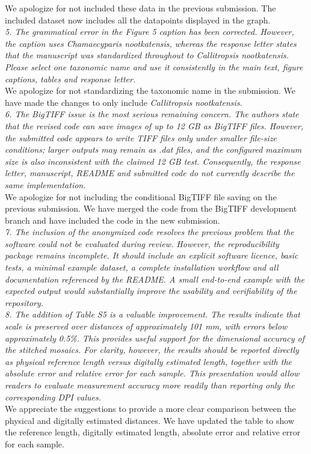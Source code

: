 \documentclass[12pt,a4paper]{article}
\begin{document}
We apologize for not included these data in the previous submission. The included dataset now includes all the datapoints displayed in the graph. \\ 

\emph{5.      The grammatical error in the Figure 5 caption has been corrected. However, the caption uses Chamaecyparis nootkatensis, whereas the response letter states that the manuscript was standardized throughout to Callitropsis nootkatensis. Please select one taxonomic name and use it consistently in the main text, figure captions, tables and response letter.} \\

We apologize for not standardizing the taxonomic name in the submission. We have made the changes to only include \emph{Callitropsis nootkatensis}. \\

\emph{6.      The BigTIFF issue is the most serious remaining concern. The authors state that the revised code can save images of up to 12 GB as BigTIFF files. However, the submitted code appears to write TIFF files only under smaller file-size conditions; larger outputs may remain as .dat files, and the configured maximum size is also inconsistent with the claimed 12 GB test. Consequently, the response letter, manuscript, README and submitted code do not currently describe the same implementation.} \\

We apologize for not including the conditional BigTIFF file saving on the previous submission. We have merged the code from the BigTIFF development branch and have included the code in the new submission. \\

\emph{7.      The inclusion of the anonymized code resolves the previous problem that the software could not be evaluated during review. However, the reproducibility package remains incomplete. It should include an explicit software licence, basic tests, a minimal example dataset, a complete installation workflow and all documentation referenced by the README. A small end-to-end example with the expected output would substantially improve the usability and verifiability of the repository.} \\

\emph{8.      The addition of Table S5 is a valuable improvement. The results indicate that scale is preserved over distances of approximately 101 mm, with errors below approximately 0.5\%. This provides useful support for the dimensional accuracy of the stitched mosaics. For clarity, however, the results should be reported directly as physical reference length versus digitally estimated length, together with the absolute error and relative error for each sample. This presentation would allow readers to evaluate measurement accuracy more readily than reporting only the corresponding DPI values.} \\

We appreciate the suggestions to provide a more clear comparison between the physical and digitally estimated distances. We have updated the table to show the reference length, digitally estimated length, absolute error and relative error for each sample. \\  
\end{document}
